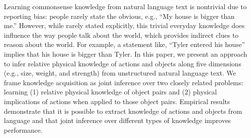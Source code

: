 Learning commonsense knowledge from natural language text is nontrivial due to reporting bias: people rarely state the obvious, e.g., ``My house is bigger than me.'' However, while rarely stated explicitly, this trivial everyday knowledge does influence the way people talk about the world, which provides indirect clues to reason about the world. For example, a statement like, ``Tyler entered his house'' implies that his house is bigger than Tyler. In this paper, we present an approach to infer relative physical knowledge of actions and objects along five dimensions (e.g., size, weight, and strength) from unstructured natural language text. We frame knowledge acquisition as joint inference over two closely related problems: learning (1) relative physical knowledge of object pairs and (2) physical implications of actions when applied to those object pairs. Empirical results demonstrate that it is possible to extract knowledge of actions and objects from language and that joint inference over different types of knowledge improves performance.
